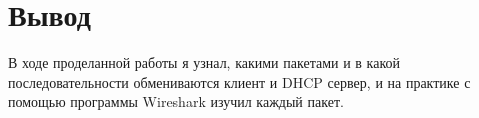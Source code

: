 \chapter{Вывод}
\label{ch:chap3}

В ходе проделанной работы я узнал, какими пакетами и в какой последовательности обмениваются клиент и DHCP сервер, и на практике
с помощью программы Wireshark изучил каждый пакет.
\endinput